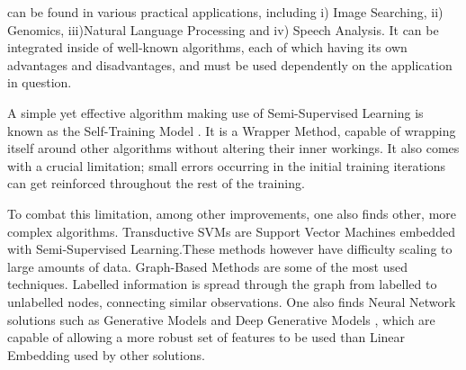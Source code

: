  can be found in various practical applications, including i) Image Searching, ii) Genomics, iii)Natural Language Processing and iv) Speech Analysis. It can be integrated inside of well-known algorithms, each of which having its own advantages and disadvantages, and must be used dependently on the application in question.

A simple yet effective algorithm making use of Semi-Supervised Learning is known as the Self-Training Model \citep{mcclosky2006effective, zhu2009introduction}. It is a Wrapper Method, capable of wrapping itself around other algorithms without altering their inner workings. It also comes with a crucial limitation; small errors occurring in the initial training iterations can get reinforced throughout the rest of the training.

To combat this limitation, among other improvements, one also finds other, more complex algorithms. Transductive SVMs \citep{bennett1999semi} are Support Vector Machines embedded with Semi-Supervised Learning.These methods however have difficulty scaling to large amounts of data. Graph-Based Methods \citep{goldberg2006seeing, zhu2009introduction} are some of the most used techniques. Labelled information is spread through the graph from labelled to unlabelled nodes, connecting similar observations. One also finds Neural Network solutions such as Generative Models and Deep Generative Models \citep{zhu2009introduction, kingma2014semi}, which are capable of allowing a more robust set of features to be used than Linear Embedding used by other solutions.

